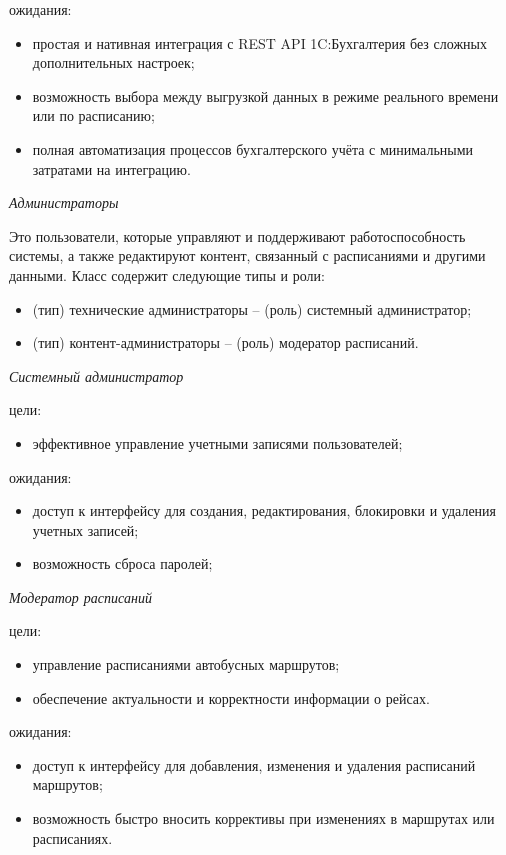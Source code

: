 \noindent ожидания:
\begin{itemize}
    \item простая и нативная интеграция с REST API 1C:Бухгалтерия без
    сложных дополнительных настроек;
    \item возможность выбора между выгрузкой данных в режиме реального
    времени или по расписанию;
    \item полная автоматизация процессов бухгалтерского учёта с
    минимальными затратами на интеграцию.
\end{itemize}

\begin{center}
    \textit{Администраторы}
\end{center}

Это пользователи, которые управляют и поддерживают
работоспособность системы, а также редактируют контент, связанный с расписаниями
и другими данными. Класс содержит следующие типы и роли:
\begin{itemize}
    \item (тип) технические администраторы -- (роль) системный администратор;
    \item (тип) контент-администраторы -- (роль) модератор расписаний.
\end{itemize}

\null

\noindent\textit{Системный администратор}

\noindent цели:
\begin{itemize}
    \item эффективное управление учетными записями пользователей;
\end{itemize}

\noindent ожидания:
\begin{itemize}
    \item доступ к интерфейсу для создания, редактирования, блокировки и
    удаления учетных записей;
    \item возможность сброса паролей;
\end{itemize}

\null

\noindent\textit{Модератор расписаний}

\noindent цели:
\begin{itemize}
    \item управление расписаниями автобусных маршрутов;
    \item обеспечение актуальности и корректности информации о рейсах.
\end{itemize}

\noindent ожидания:
\begin{itemize}
    \item доступ к интерфейсу для добавления, изменения и удаления
    расписаний маршрутов;
    \item возможность быстро вносить коррективы при изменениях в
    маршрутах или расписаниях.
\end{itemize}
